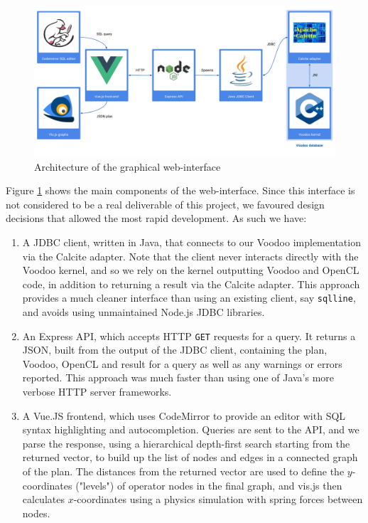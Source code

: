 \begin{figure}
\includegraphics[width=\textwidth]{design-and-implementation/web-interface.pdf}
\centering
\caption{Architecture of the graphical web-interface}
\label{fig:web-interface}
\end{figure}

Figure \ref{fig:web-interface} shows the main components of the web-interface. Since this interface is not considered to be a real deliverable of this project, we favoured design decisions that allowed the most rapid development. As such we have:

\begin{enumerate}
\item A JDBC client, written in Java, that connects to our Voodoo implementation via the Calcite adapter. Note that the client never interacts directly with the Voodoo kernel, and so we rely on the kernel outputting Voodoo and OpenCL code, in addition to returning a result via the Calcite adapter. This approach provides a much cleaner interface than using an existing client, say \texttt{sqlline}, and avoids using unmaintained Node.js JDBC libraries.
\item An Express API, which accepts HTTP \texttt{GET} requests for a query. It returns a JSON, built from the output of the JDBC client, containing the plan, Voodoo, OpenCL and result for a query as well as any warnings or errors reported. This approach was much faster than using one of Java's more verbose HTTP server frameworks.
\item A Vue.JS frontend, which uses CodeMirror to provide an editor with SQL syntax highlighting and autocompletion. Queries are sent to the API, and we parse the response, using a hierarchical depth-first search starting from the returned vector, to build up the list of nodes and edges in a connected graph of the plan. The distances from the returned vector are used to define the $y$-coordinates ("levels") of operator nodes in the final graph, and vis.js then calculates $x$-coordinates using a physics simulation with spring forces between nodes.
\end{enumerate}

